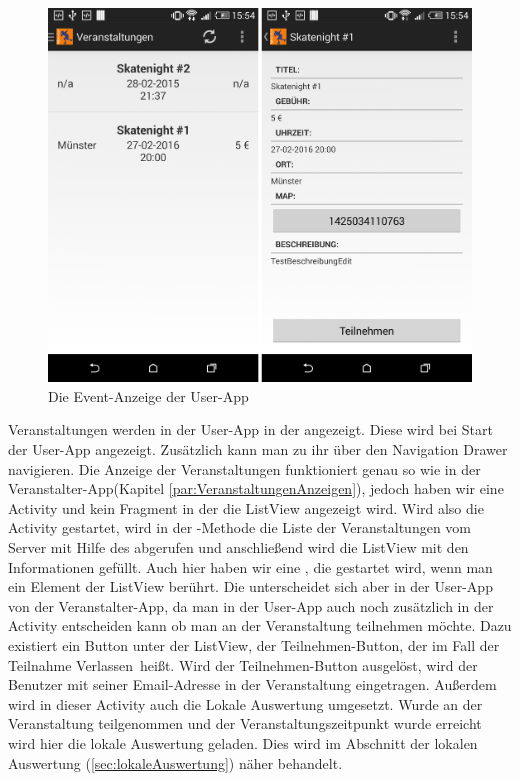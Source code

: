 \begin{figure}[htb]
\centering
\includegraphics[width=12cm]{graphics/show_events_user_app.png}
\caption{Die Event-Anzeige der User-App}
\label{fig:show_events_user_app}
\end{figure}

Veranstaltungen werden in der User-App in der  angezeigt. Diese wird bei Start der User-App angezeigt. Zusätzlich kann man zu ihr über den Navigation Drawer navigieren. Die Anzeige der Veranstaltungen funktioniert genau so wie in der Veranstalter-App(Kapitel \ref{par:VeranstaltungenAnzeigen}), jedoch haben wir eine Activity und kein Fragment in der die ListView angezeigt wird. Wird also die Activity gestartet, wird in der -Methode die Liste der Veranstaltungen vom Server mit Hilfe des  abgerufen und anschließend wird die ListView mit den Informationen gefüllt. Auch hier haben wir eine , die gestartet wird, wenn man ein Element der ListView berührt. Die  unterscheidet sich aber in der User-App von der Veranstalter-App, da man in der User-App auch noch zusätzlich in der Activity entscheiden kann ob man an der Veranstaltung teilnehmen möchte. Dazu existiert ein Button unter der ListView, der \glqq Teilnehmen\grqq-Button, der im Fall der Teilnahme \glqq Verlassen\grqq\ heißt. Wird der \glqq Teilnehmen\grqq-Button ausgelöst, wird der Benutzer mit seiner Email-Adresse in der Veranstaltung eingetragen. Außerdem wird in dieser Activity auch die Lokale Auswertung umgesetzt. Wurde an der Veranstaltung teilgenommen und der Veranstaltungszeitpunkt wurde erreicht wird hier die lokale Auswertung geladen. Dies wird im Abschnitt der lokalen Auswertung (\ref{sec:lokaleAuswertung}) näher behandelt.
\FloatBarrier

